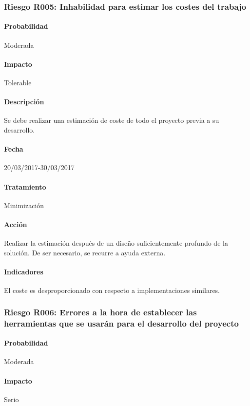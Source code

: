 \documentclass[10pt,a4paper]{article}
\begin{document}
			\subsubsection{Riesgo R005: Inhabilidad para estimar los costes del trabajo}
				\paragraph{Probabilidad} Moderada
				\paragraph{Impacto}	Tolerable
				\paragraph{Descripción} Se debe realizar una estimación de coste de todo el proyecto previa a su desarrollo.
				\paragraph{Fecha} 20/03/2017-30/03/2017 %
				\paragraph{Tratamiento} Minimización %
				\paragraph{Acción} Realizar la estimación después de un diseño suficientemente profundo de la solución. De ser necesario, se recurre a ayuda externa. %
				\paragraph{Indicadores} El coste es desproporcionado con respecto a implementaciones similares. %
				
			\subsubsection{Riesgo R006: Errores a la hora de establecer las herramientas que se usarán para el desarrollo del proyecto}
				\paragraph{Probabilidad} Moderada
				\paragraph{Impacto}	Serio
\end{document}
